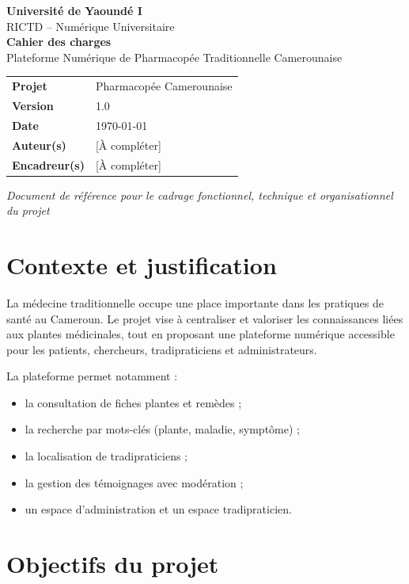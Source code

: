 \documentclass[12pt,a4paper]{article}
\begin{document}
\begin{titlepage}
  \centering
  {\Large \textbf{Université de Yaoundé I}}\\[0.4cm]
  {\large RICTD -- Numérique Universitaire}\\[2cm]

  {\Huge \textbf{Cahier des charges}}\\[0.4cm]
  {\Large Plateforme Numérique de Pharmacopée Traditionnelle Camerounaise}\\[1.4cm]

  \begin{tabular}{>{\bfseries}l l}
    Projet & Pharmacopée Camerounaise \\
    Version & 1.0 \\
    Date & \today \\
    Auteur(s) & [À compléter] \\
    Encadreur(s) & [À compléter]
  \end{tabular}

  \vfill
  \textit{Document de référence pour le cadrage fonctionnel, technique et organisationnel du projet}
\end{titlepage}

\tableofcontents
\newpage

\section{Contexte et justification}
La médecine traditionnelle occupe une place importante dans les pratiques de santé au Cameroun. Le projet vise à centraliser et valoriser les connaissances liées aux plantes médicinales, tout en proposant une plateforme numérique accessible pour les patients, chercheurs, tradipraticiens et administrateurs.

La plateforme permet notamment :
\begin{itemize}[leftmargin=1.2cm]
  \item la consultation de fiches plantes et remèdes ;
  \item la recherche par mots-clés (plante, maladie, symptôme) ;
  \item la localisation de tradipraticiens ;
  \item la gestion des témoignages avec modération ;
  \item un espace d'administration et un espace tradipraticien.
\end{itemize}

\section{Objectifs du projet}
\end{document}
